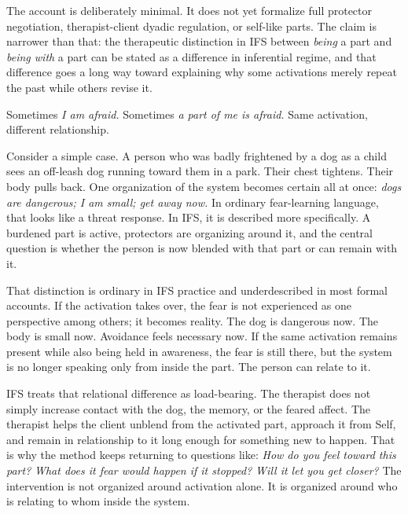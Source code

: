 \documentclass[11pt,a4paper]{article}
\makeatletter
\renewcommand\section{\@startsection{section}{1}{0pt}{2.3ex plus 0.6ex minus 0.2ex}{1.1ex plus 0.2ex}{\large\bfseries}}
\makeatother
\begin{document}
The account is deliberately minimal. It does not yet formalize full
protector negotiation, therapist-client dyadic regulation, or self-like
parts. The claim is narrower than that: the therapeutic distinction in
IFS between \emph{being} a part and \emph{being with} a part can be
stated as a difference in inferential regime, and that difference goes a
long way toward explaining why some activations merely repeat the past
while others revise it.

\section{Introduction}\label{introduction}

Sometimes \emph{I am afraid.} Sometimes \emph{a part of me is afraid.}
Same activation, different relationship.

Consider a simple case. A person who was badly frightened by a dog as a
child sees an off-leash dog running toward them in a park. Their chest
tightens. Their body pulls back. One organization of the system becomes
certain all at once: \emph{dogs are dangerous; I am small; get away
now.} In ordinary fear-learning language, that looks like a threat
response. In IFS, it is described more specifically. A burdened part is
active, protectors are organizing around it, and the central question is
whether the person is now blended with that part or can remain with it.

That distinction is ordinary in IFS practice and underdescribed in most
formal accounts. If the activation takes over, the fear is not
experienced as one perspective among others; it becomes reality. The dog
is dangerous now. The body is small now. Avoidance feels necessary now.
If the same activation remains present while also being held in
awareness, the fear is still there, but the system is no longer speaking
only from inside the part. The person can relate to it.

IFS treats that relational difference as load-bearing. The therapist
does not simply increase contact with the dog, the memory, or the feared
affect. The therapist helps the client unblend from the activated part,
approach it from Self, and remain in relationship to it long enough for
something new to happen. That is why the method keeps returning to
questions like: \emph{How do you feel toward this part?} \emph{What does
it fear would happen if it stopped?} \emph{Will it let you get closer?}
The intervention is not organized around activation alone. It is
organized around who is relating to whom inside the system.
\end{document}
